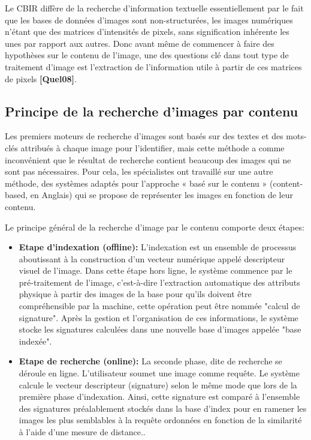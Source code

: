 Le CBIR diffère de la recherche d’information textuelle essentiellement par le fait que les bases de données d’images sont non-structurées, les images numériques n'étant que des matrices
d'intensités de pixels, sans signification inhérente les unes par rapport aux autres. Donc avant même de commencer à faire des hypothèses sur le contenu de l'image, une des questions clé dans tout type de traitement d’image est l’extraction de l’information utile à partir de ces matrices de pixels \textbf{[Quel08]}.\\

\subsection{Principe de la recherche d’images par contenu}
Les premiers moteurs de recherche d’images sont basés sur des textes et des
mots-clés attribués à chaque image pour l'identifier, mais cette méthode a
comme inconvénient que le résultat de recherche contient beaucoup des images qui ne sont pas nécessaires. Pour cela, les spécialistes ont travaillé
sur une autre méthode, des systèmes adaptés pour l'approche « basé sur le
contenu » (content-based, en Anglais) qui se propose de représenter les
images en fonction de leur contenu.

Le principe général de la recherche d'image par le contenu comporte deux étapes:
\begin{itemize}
	\item  \textbf{Etape d'indexation (offline):} L'indexation est un ensemble de processus aboutissant à la
	construction d’un vecteur numérique appelé descripteur visuel de l’image.
	Dans cette étape hors ligne, le système commence	par le pré-traitement de l'image, c’est-à-dire l'extraction automatique des	attributs physique à partir des images de la base pour qu'ils doivent être compréhensible par la machine, cette opération peut être nommée "calcul de signature". Après la gestion et l'organisation de ces informations, le système stocke les signatures calculées dans une nouvelle base d'images appelée "base indexée".
	
	\item \textbf{Etape de recherche (online):} La seconde phase, dite de recherche se déroule en ligne. L'utilisateur soumet une image comme requête. Le système calcule le vecteur descripteur (signature)  selon le même mode que lors de la première phase d'indexation. Ainsi, cette signature est comparé à l'ensemble des signatures préalablement stockés dans la base d'index pour en ramener les images les plus semblables à la requête ordonnées en fonction de la similarité à l’aide d’une mesure de distance..
\end{itemize}

